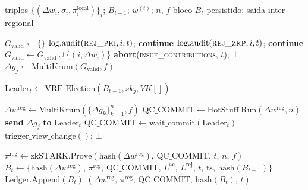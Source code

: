 \documentclass[12pt]{article}
\begin{document}
\begin{algorithm}[!ht]
\caption{Fog Intra-Cluster Round — Rodada $t$ (nó $j$)}
\label{alg:fog_round}
\begin{algorithmic}[1]
\Require triplos $\{(\Delta w_i, \sigma_i, \pi_i^{\mathrm{local}})\}_i$;
         $B_{t-1}$; $w^{(t)}$; $n$, $f$
\Ensure  bloco $B_t$ persistido; saída inter-regional

\State $G_{\mathrm{valid}} \leftarrow \{\}$
    \State $\mathrm{log.audit}(\textsc{rej\_pki}, i, t)$; \textbf{continue}
  \EndIf
    \State $\mathrm{log.audit}(\textsc{rej\_zkp}, i, t)$; \textbf{continue}
  \EndIf
  \State $G_{\mathrm{valid}} \leftarrow G_{\mathrm{valid}} \cup \{(i, \Delta w_i)\}$
\EndFor
{}
  \State \textbf{abort}(\textsc{insuf\_contributions}, $t$); \Return $\bot$
\EndIf
\State $\Delta g_j \leftarrow \mathrm{MultiKrum}(G_{\mathrm{valid}}, f)$

\State $\mathrm{Leader}_t \leftarrow \mathrm{VRF\text{-}Election}(B_{t-1}, sk_j, \mathit{VK}[])$

  \State $\Delta w^{\mathrm{reg}} \leftarrow \mathrm{MultiKrum}(\{\Delta g_k\}_{k=1}^{n}, f)$
  \State $\mathrm{QC\_COMMIT} \leftarrow \mathrm{HotStuff.Run}(\Delta w^{\mathrm{reg}}, n)$
\Else
  \State \textbf{send} $\Delta g_j$ \textbf{to} $\mathrm{Leader}_t$
  \State $\mathrm{QC\_COMMIT} \leftarrow \mathrm{wait\_commit}(\mathrm{Leader}_t)$
\EndIf
{}
  \State $\mathrm{trigger\_view\_change}()$; \Return $\bot$
\EndIf

\State $\pi^{\mathrm{reg}} \leftarrow \mathrm{zkSTARK.Prove}(\mathrm{hash}(\Delta w^{\mathrm{reg}}),\,
       \mathrm{QC\_COMMIT},\, t,\, n,\, f)$
\State $B_t \leftarrow \{\mathrm{hash}(\Delta w^{\mathrm{reg}}),\, \pi^{\mathrm{reg}},\,
       \mathrm{QC\_COMMIT},\, L^{\mathrm{ac}},\, L^{\mathrm{rej}},\, t,\,
       \mathrm{ts},\, \mathrm{hash}(B_{t-1})\}$
\State $\mathrm{Ledger.Append}(B_t)$
\State \Return $(\Delta w^{\mathrm{reg}},\, \pi^{\mathrm{reg}},\, \mathrm{QC\_COMMIT},\,
       \mathrm{hash}(B_t),\, t)$

\end{algorithmic}
\end{algorithm}
\end{document}
